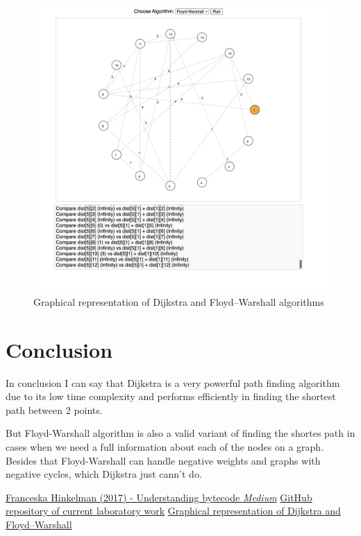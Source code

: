 \documentclass[12pt]{article}
\begin{document}
\begin{figure}[h]
    \centering
    \includegraphics[width=1\textwidth]{images/site_warshall.png}
    \caption{Graphical representation of Dijkstra and Floyd–Warshall algorithms}
    \label{fig:sitewarshall}
\end{figure}

\section*{Conclusion}

In conclusion I can say that Dijkstra is a very powerful path finding algorithm due to its low
time complexity and performs efficiently in finding the shortest path between 2 points.

But Floyd-Warshall algorithm is also a valid variant of finding the shortes path in cases when we need a 
full information about each of the nodes on a graph. Besides that Floyd-Warshall can handle negative weights
and graphs with negative cycles, which Dijkstra just cann't do.


\clearpage
\begin{thebibliography}{9}

   \href{https://medium.com/dailyjs/understanding-v8s-bytecode-317d46c94775}{Franceska
      Hinkelman (2017) - Understanding bytecode \emph{Medium}}
   \href{https://github.com/DdimaPos/AA-labs/tree/main/Lab4}{GitHub repository of current laboratory work}
   \href{https://dfs-bfs-visualization.vercel.app/}{Graphical representation of Dijkstra and Floyd–Warshall}
\end{thebibliography}
\end{document}
